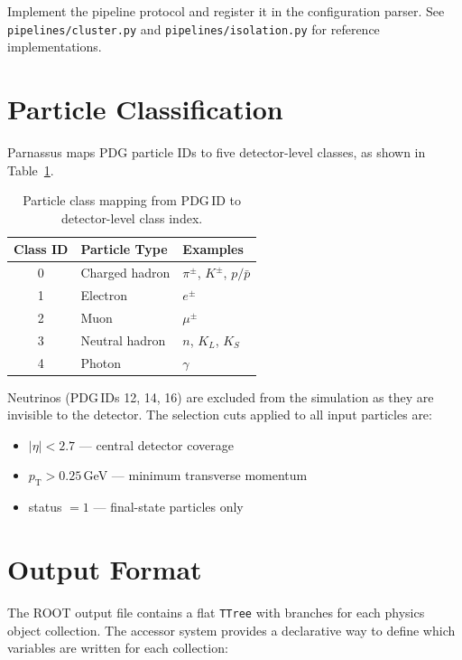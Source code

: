 \documentclass[11pt,a4paper]{article}
\begin{document}
Implement the pipeline protocol and register it in the configuration parser. See
\texttt{pipelines/cluster.py} and \texttt{pipelines/isolation.py} for reference
implementations.

\section{Particle Classification}
\label{sec:particle-class}

Parnassus maps PDG particle IDs to five detector-level classes, as shown in
Table~\ref{tab:classes}.

\begin{table}[H]
\centering
\caption{Particle class mapping from PDG\,ID to detector-level class index.}
\label{tab:classes}
\begin{tabular}{@{}cll@{}}
\toprule
\textbf{Class ID} & \textbf{Particle Type} & \textbf{Examples} \\
\midrule
0 & Charged hadron & $\pi^\pm$, $K^\pm$, $p/\bar{p}$ \\
1 & Electron       & $e^\pm$ \\
2 & Muon           & $\mu^\pm$ \\
3 & Neutral hadron & $n$, $K_L$, $K_S$ \\
4 & Photon         & $\gamma$ \\
\bottomrule
\end{tabular}
\end{table}

Neutrinos (PDG\,IDs 12, 14, 16) are excluded from the simulation as they are invisible
to the detector. The selection cuts applied to all input particles are:

\begin{itemize}
  \item $|\eta| < 2.7$ --- central detector coverage
  \item $p_\mathrm{T} > 0.25$\,GeV --- minimum transverse momentum
  \item status $= 1$ --- final-state particles only
\end{itemize}

\section{Output Format}
\label{sec:output}

The ROOT output file contains a flat \texttt{TTree} with branches for each physics
object collection. The accessor system provides a declarative way to define which
variables are written for each collection:
\end{document}
